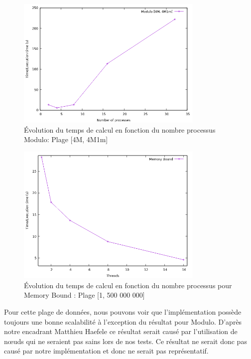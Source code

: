 \begin{figure}
            \centering 
            \includegraphics[width=0.8\textwidth]{Modulo_4M.png}
        \caption[ Évolution du temps de calcul en fonction du nombre processus]
        {\small Évolution du temps de calcul en fonction du nombre processus Modulo: Plage [4M, 4M1m]} 
        \label{fig:5}
\end{figure}
	
\begin{figure}
        \centering 
            \includegraphics[width=0.8\textwidth]{Memory.png}
        \caption[Évolution du temps de calcul en fonction du nombre processus]
        {\small Évolution du temps de calcul en fonction du nombre processus pour Memory Bound : Plage [1, 500 000 000]} 
        \label{fig:6}
\end{figure}

	Pour cette plage de données, nous pouvons voir que l'implémentation possède toujours une bonne scalabilité à l'exception du résultat pour Modulo. D'après notre encadrant Matthieu Haefele ce résultat serait causé par l'utilisation de nœuds qui ne seraient pas sains lors de nos tests. Ce résultat ne serait donc pas causé par notre implémentation et donc ne serait pas représentatif.\\
	
